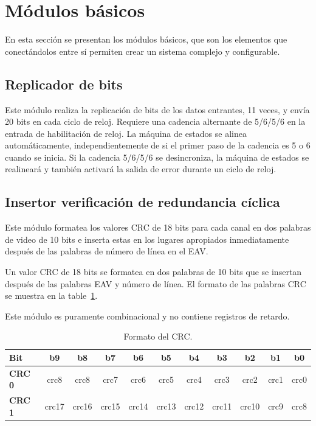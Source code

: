 \section{Módulos básicos}

En esta sección se presentan los módulos básicos, que son los elementos que
conectándolos entre sí permiten crear un sistema complejo y configurable.

\subsection{Replicador de bits}

  Este módulo realiza la replicación de bits de los datos entrantes, 11 veces,
  y envía 20 bits en cada ciclo de reloj. Requiere una cadencia
  alternante de 5/6/5/6 en la entrada de habilitación de reloj. La máquina
  de estados se alinea automáticamente, independientemente de si el primer
  paso de la cadencia es 5 o 6 cuando se inicia. Si la cadencia 5/6/5/6 se
  desincroniza, la máquina de estados se realineará y también activará la
  salida de error durante un ciclo de reloj.

\subsection{Insertor verificación de redundancia cíclica}

Este módulo formatea los valores CRC de 18 bits para cada canal en dos palabras
de video de 10 bits e inserta estas en los lugares apropiados inmediatamente
después de las palabras de número de línea en el EAV\@.

Un valor CRC de 18 bits se formatea en dos palabras de 10 bits que se insertan
después de las palabras EAV y número de línea. El formato de las palabras CRC
se muestra en la table~\ref{tab:crc}.

Este módulo es puramente combinacional y no contiene registros de retardo.

  \begin{table}[h]
    \centering
    \caption{Formato del CRC.}\label{tab:crc}
    \begin{tabular}{lcccccccccc}
      \toprule
      \textbf{Bit} & b9 & b8 & b7 & b6 & b5 & b4 & b3 & b2 & b1 & b0 \\
      \hline
      \textbf{CRC 0} & crc8 & crc8 & crc7 & crc6 & crc5 & crc4 & crc3 & crc2 & crc1 & crc0 \\
      \hline
      \textbf{CRC 1} & crc17 & crc16 & crc15 & crc14 & crc13 & crc12 & crc11 & crc10 & crc9 & crc8 \\
      \bottomrule
    \end{tabular}
  \end{table}

